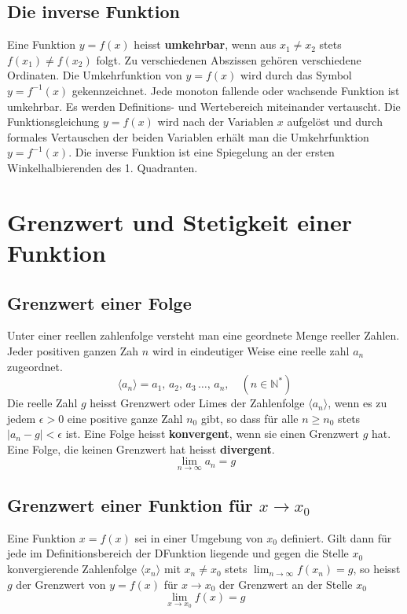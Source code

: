\subsection{Die inverse Funktion}
Eine Funktion $y=f\left(x\right)$ heisst \textbf{umkehrbar}, wenn aus $x_1\neq x_2$ stets $f\left(x_1\right)\neq f\left(x_2\right)$ folgt. Zu verschiedenen Abszissen gehören verschiedene Ordinaten. Die Umkehrfunktion von $y=f\left(x\right)$ wird durch das Symbol $y=f^{-1}\left(x\right)$ gekennzeichnet.
\newline\newline
Jede monoton fallende oder wachsende Funktion ist umkehrbar. Es werden Definitions- und Wertebereich miteinander vertauscht. Die Funktionsgleichung $y=f\left(x\right)$ wird nach der Variablen $x$ aufgelöst und durch formales Vertauschen der beiden Variablen erhält man die Umkehrfunktion $y=f^{-1}\left(x\right)$. Die inverse Funktion ist eine Spiegelung an der ersten Winkelhalbierenden des 1. Quadranten.
\section{Grenzwert und Stetigkeit einer Funktion}
\subsection{Grenzwert einer Folge}
Unter einer reellen zahlenfolge versteht man eine geordnete Menge reeller Zahlen. Jeder positiven ganzen Zah $n$ wird in eindeutiger Weise eine reelle zahl $a_n$ zugeordnet.
\begin{equation}
\boxed{\langle a_n\rangle=a_1,\,a_2,\,a_3\,\dotso,\, a_n,\quad \left(n\in \mathbb{N}^*\right)}
\end{equation}
Die reelle Zahl $g$ heisst Grenzwert oder Limes der Zahlenfolge $\langle a_n\rangle$, wenn es zu jedem $\epsilon >0$ eine positive ganze Zahl $n_0$ gibt, so dass für alle $n\geq n_0$ stets $\Big\vert a_n-g\Big\vert < \epsilon$ ist. Eine Folge heisst \textbf{konvergent}, wenn sie einen Grenzwert $g$ hat. Eine Folge, die keinen Grenzwert hat heisst \textbf{divergent}.
\begin{equation}
\boxed{\displaystyle \lim_{n\rightarrow \infty} a_n = g}
\end{equation}
\subsection{Grenzwert einer Funktion für $x\rightarrow x_0$}
Eine Funktion $x=f\left(x\right)$ sei in einer Umgebung von $x_0$ definiert. Gilt dann für jede im Definitionsbereich der DFunktion liegende und gegen die Stelle $x_0$ konvergierende Zahlenfolge $\langle x_n\rangle$ mit $x_n\neq x_0$ stets $\displaystyle \lim_{n\rightarrow \infty} f\left(x_n\right)=g$, so heisst $g$ der Grenzwert von $y=f\left(x\right)$ für $x\rightarrow x_0$ der Grenzwert an der Stelle $x_0$
\begin{equation} 
\boxed{\displaystyle \lim_{x\rightarrow x_0}f\left(x\right)=g}
\end{equation} 
